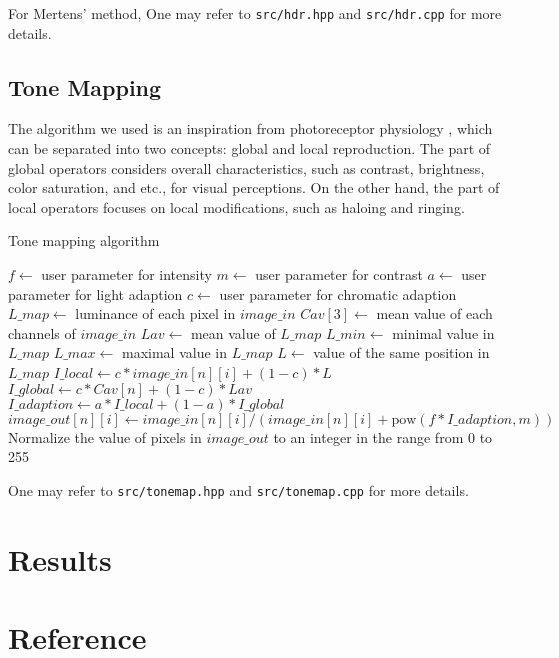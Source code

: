 \documentclass[11pt]{article}
\begin{document}
For Mertens' method, 
One may refer to \texttt{src/hdr.hpp} and \texttt{src/hdr.cpp} for more details.

\subsection{Tone Mapping}
The algorithm we used is an inspiration from photoreceptor physiology \cite{ref:tone-map}, which can be separated into two concepts: global and local reproduction. The part of global operators considers overall characteristics, such as contrast, brightness, color saturation, and etc., for visual perceptions. On the other hand, the part of local operators focuses on local modifications, such as haloing and ringing.

\begin{algorithm}
\caption{Tone mapping algorithm \cite{ref:tone-map}}\label{euclid}
\begin{algorithmic}[1]
\State $f\gets$ user parameter for intensity
\State $m\gets$ user parameter for contrast
\State $a\gets$ user parameter for light adaption 
\State $c\gets$ user parameter for chromatic adaption
\State $L\_map\gets$ luminance of each pixel in $image\_in$
\State $Cav[3]\gets$ mean value of each channels of $image\_in$
\State $Lav\gets$ mean value of $L\_map$
\State $L\_min\gets$ minimal value in $L\_map$
\State $L\_max\gets$ maximal value in $L\_map$
\State $L\gets$ value of the same position in $L\_map$
\State $I\_local\gets c* image\_in[n][i]+ (1-c)*L$
\State $I\_global\gets c*Cav[n]+ (1-c)* Lav$
\State $I\_adaption\gets a*I\_local+(1-a)*I\_global$
\State $image\_out[n][i]\gets image\_in[n][i]/(image\_in[n][i]+\mbox{pow}(f*I\_adaption, m))$
\EndFor
\EndFor
\State Normalize the value of pixels in $image\_out$ to an integer in the range from 0 to 255
\EndFunction
\end{algorithmic}
\end{algorithm}

One may refer to \texttt{src/tonemap.hpp} and \texttt{src/tonemap.cpp} for more details.

\section{Results}

\begin{figure}[!ht]
	\centering
	\label{distort}
\end{figure}

\section{Reference}


\end{document}
